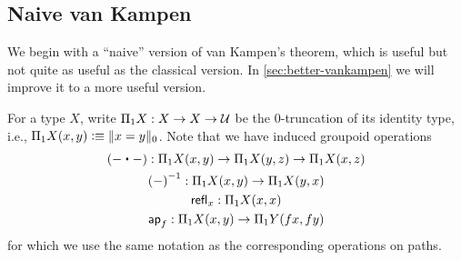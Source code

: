 \subsection{Naive van Kampen}
\label{sec:naive-vankampen}

We begin with a ``naive'' version of van Kampen's theorem, which is useful but not quite as useful as the classical version.
In \autoref{sec:better-vankampen} we will improve it to a more useful version.

For a type $X$, write $\Pi_1 X: X\to X\to \type$ be the $0$-truncation of its identity type, i.e., $\Pi_1 X(x,y) \defeq \trunc0{x=y}$.
Note that we have induced groupoid operations
\begin{gather*}
  (-\ct-) : \Pi_1X(x,y) \to \Pi_1X(y,z) \to \Pi_1X(x,z)\\
  \opp{(-)} : \Pi_1X(x,y) \to \Pi_1X(y,x)\\
  \refl{x} : \Pi_1X(x,x)\\
  \apfunc{f} : \Pi_1X(x,y) \to \Pi_1Y(fx,fy)
\end{gather*}
for which we use the same notation as the corresponding operations on paths.

